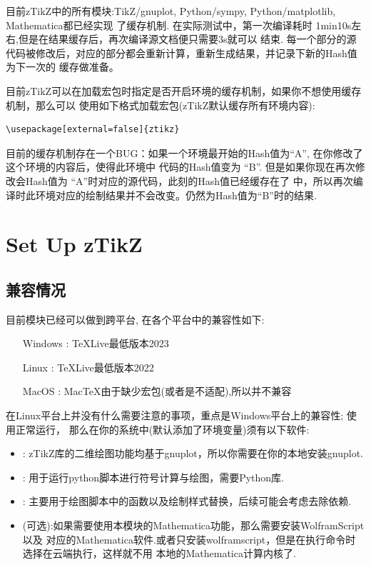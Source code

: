 目前zTikZ中的所有模块:TikZ/gnuplot, Python/sympy, Python/matplotlib, Mathematica都已经实现
了缓存机制. 在实际测试中，第一次编译耗时 1min10s左右,但是在结果缓存后，再次编译源文档便只需要3s就可以
结束. 每一个部分的源代码被修改后，对应的部分都会重新计算，重新生成结果，并记录下新的Hash值为下一次的
缓存做准备。

目前zTikZ可以在加载宏包时指定是否开启环境的缓存机制，如果你不想使用缓存机制，那么可以
使用如下格式加载宏包(zTikZ默认缓存所有环境内容):
\begin{verbatim}
\usepackage[external=false]{ztikz}
\end{verbatim}

\begin{remark}
    目前的缓存机制存在一个BUG：如果一个环境最开始的Hash值为``A'', 在你修改了这个环境的内容后，使得此环境中
    代码的Hash值变为 ``B''. 但是如果你现在再次修改会Hash值为 ``A''时对应的源代码，此刻的Hash值已经缓存在了
     中，所以再次编译时此环境对应的绘制结果并不会改变。仍然为Hash值为``B''时的结果. 
\end{remark}

\section{Set Up zTikZ}
\subsection{兼容情况}
目前模块已经可以做到跨平台, 在各个平台中的兼容性如下:

\hspace*{10em}\parbox{8cm}{
\begin{itemize}
    \item[Windows]: \TeX{}Live最低版本2023
    \item[Linux]: \TeX{}Live最低版本2022
    \item[MacOS]: Mac\TeX{}由于缺少宏包(或者是不适配),所以并不兼容
\end{itemize}}

在Linux平台上并没有什么需要注意的事项，重点是Windows平台上的兼容性; 使用正常运行，
那么在你的系统中(默认添加了环境变量)须有以下软件:
\begin{itemize}
    \item {}: zTikZ库的二维绘图功能均基于gnuplot，所以你需要在你的本地安装gnuplot.
    \item {}: 用于运行python脚本进行符号计算与绘图，需要Python库.
    \item {}: 主要用于绘图脚本中的函数以及绘制样式替换，后续可能会考虑去除依赖.
    \item {}(可选):如果需要使用本模块的Mathematica功能，那么需要安装WolframScript以及
        对应的Mathematica软件.或者只安装wolframscript，但是在执行命令时选择在云端执行，这样就不用
        本地的Mathematica计算内核了. 
\end{itemize}


